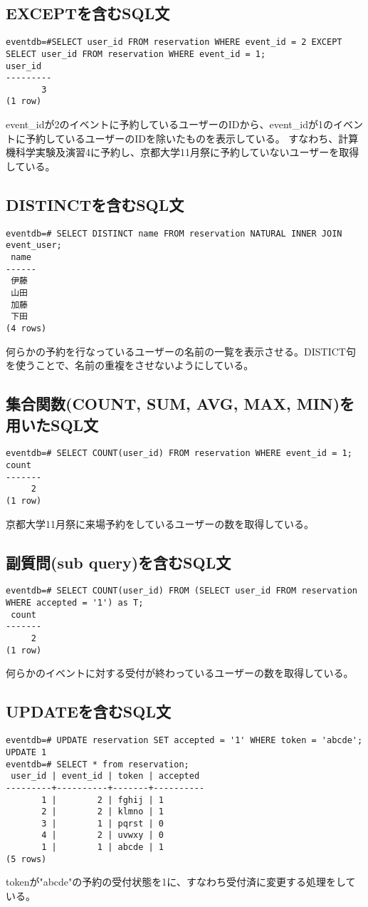 \documentclass[dvipdfmx]{jarticle}
\begin{document}
\subsection{EXCEPTを含むSQL文}
\begin{lstlisting}
eventdb=#SELECT user_id FROM reservation WHERE event_id = 2 EXCEPT SELECT user_id FROM reservation WHERE event_id = 1;
user_id
---------
       3
(1 row)
\end{lstlisting}
event\_idが2のイベントに予約しているユーザーのIDから、event\_idが1のイベントに予約しているユーザーのIDを除いたものを表示している。
すなわち、計算機科学実験及演習4に予約し、京都大学11月祭に予約していないユーザーを取得している。

\subsection{DISTINCTを含むSQL文}
\begin{lstlisting}
eventdb=# SELECT DISTINCT name FROM reservation NATURAL INNER JOIN event_user;
 name
------
 伊藤
 山田
 加藤
 下田
(4 rows)
\end{lstlisting}
何らかの予約を行なっているユーザーの名前の一覧を表示させる。DISTICT句を使うことで、名前の重複をさせないようにしている。

\subsection{集合関数(COUNT, SUM, AVG, MAX, MIN)を用いたSQL文}
\begin{lstlisting}
eventdb=# SELECT COUNT(user_id) FROM reservation WHERE event_id = 1;
count
-------
     2
(1 row)
\end{lstlisting}
京都大学11月祭に来場予約をしているユーザーの数を取得している。

\subsection{副質問(sub query)を含むSQL文}
\begin{lstlisting}
eventdb=# SELECT COUNT(user_id) FROM (SELECT user_id FROM reservation WHERE accepted = '1') as T;
 count
-------
     2
(1 row)
\end{lstlisting}
何らかのイベントに対する受付が終わっているユーザーの数を取得している。

\subsection{UPDATEを含むSQL文}
\begin{lstlisting}
eventdb=# UPDATE reservation SET accepted = '1' WHERE token = 'abcde';
UPDATE 1
eventdb=# SELECT * from reservation;
 user_id | event_id | token | accepted
---------+----------+-------+----------
       1 |        2 | fghij | 1
       2 |        2 | klmno | 1
       3 |        1 | pqrst | 0
       4 |        2 | uvwxy | 0
       1 |        1 | abcde | 1
(5 rows)
\end{lstlisting}
tokenが"abcde"の予約の受付状態を1に、すなわち受付済に変更する処理をしている。
\end{document}
